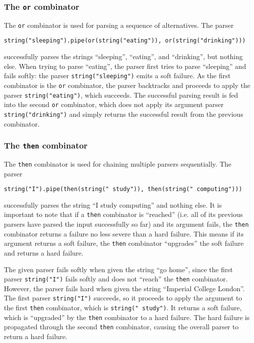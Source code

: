 \subsubsection{The \lstinline{or} combinator}
The \lstinline{or} combinator \cite{parjs:or} is used for parsing a sequence of alternatives. The parser
\begin{center}
    \lstinline{string("sleeping").pipe(or(string("eating")), or(string("drinking")))}
\end{center}
successfully parses the strings ``sleeping'', ``eating'', and ``drinking'', but nothing else. When trying to parse ``eating'', the parser first tries to parse ``sleeping'' and fails softly: the parser \lstinline{string("sleeping")} emits a soft failure. As the first combinator is the \lstinline{or} combinator, the parser backtracks and proceeds to apply the parser \lstinline{string("eating")}, which succeeds. The successful parsing result is fed into the second \lstinline{or} combinator, which does not apply its argument parser \lstinline{string("drinking")} and simply returns the successful result from the previous combinator.

\subsubsection{The \lstinline{then} combinator}
The \lstinline{then} combinator \cite{parjs:then} is used for chaining multiple parsers sequentially. The parser
\begin{center}
    \lstinline{string("I").pipe(then(string(" study")), then(string(" computing")))}
\end{center}
successfully parses the string ``I study computing'' and nothing else. It is important to note that if a \lstinline{then} combinator is ``reached'' (i.e. all of its previous parsers have parsed the input successfully so far) and its argument fails, the \lstinline{then} combinator returns a failure no less severe than a hard failure. This means if its argument returns a soft failure, the \lstinline{then} combinator ``upgrades'' the soft failure and returns a hard failure.

The given parser fails softly when given the string ``go home'', since the first parser \lstinline{string("I")} fails softly and does not ``reach'' the \lstinline{then} combinator. However, the parser fails hard when given the string ``Imperial College London''. The first parser \lstinline{string("I")} succeeds, so it proceeds to apply the argument to the first \lstinline{then} combinator, which is \lstinline{string(" study")}. It returns a soft failure, which is ``upgraded'' by the \lstinline{then} combinator to a hard failure. The hard failure is propagated through the second \lstinline{then} combinator, causing the overall parser to return a hard failure.

